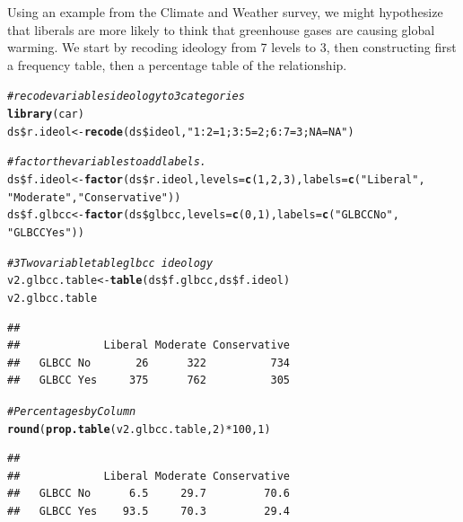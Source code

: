 \documentclass[11pt,openany]{book}\usepackage[]{graphicx}\usepackage[]{color}
\makeatletter
\newcommand{\hlnum}[1]{\textcolor[rgb]{0.686,0.059,0.569}{#1}}%
\newcommand{\hlstr}[1]{\textcolor[rgb]{0.192,0.494,0.8}{#1}}%
\newcommand{\hlcom}[1]{\textcolor[rgb]{0.678,0.584,0.686}{\textit{#1}}}%
\newcommand{\hlopt}[1]{\textcolor[rgb]{0,0,0}{#1}}%
\newcommand{\hlstd}[1]{\textcolor[rgb]{0.345,0.345,0.345}{#1}}%
\newcommand{\hlkwb}[1]{\textcolor[rgb]{0.69,0.353,0.396}{#1}}%
\newcommand{\hlkwc}[1]{\textcolor[rgb]{0.333,0.667,0.333}{#1}}%
\newcommand{\hlkwd}[1]{\textcolor[rgb]{0.737,0.353,0.396}{\textbf{#1}}}%
\newenvironment{kframe}{%
 \def\at@end@of@kframe{}%
 \ifinner\ifhmode%
  \def\at@end@of@kframe{\end{minipage}}%
  \begin{minipage}{\columnwidth}%
 \fi\fi%
 \def\FrameCommand##1{\hskip\@totalleftmargin \hskip-\fboxsep
 \colorbox{shadecolor}{##1}\hskip-\fboxsep
     \hskip-\linewidth \hskip-\@totalleftmargin \hskip\columnwidth}%
 \MakeFramed {\advance\hsize-\width
   \@totalleftmargin\z@ \linewidth\hsize
   \@setminipage}}%
 {\par\unskip\endMakeFramed%
 \at@end@of@kframe}
\newenvironment{knitrout}{}{} %
\renewenvironment{knitrout}{\begin{singlespace}}{\end{singlespace}}
\makeatother
\begin{document}
Using an example from the Climate and Weather survey, we might hypothesize that liberals are more likely to think that greenhouse gases are causing global warming.   We start by recoding ideology from 7 levels to 3, then constructing first a frequency table, then a percentage table of the relationship.
  
\begin{knitrout}
\color{fgcolor}\begin{kframe}
\begin{alltt}
\hlcom{# recode variables ideology to 3 categories}
\hlkwd{library}\hlstd{(car)}
\hlstd{ds}\hlopt{\$}\hlstd{r.ideol} \hlkwb{<-} \hlkwd{recode}\hlstd{(ds}\hlopt{\$}\hlstd{ideol,} \hlstr{"1:2=1; 3:5=2; 6:7=3; NA=NA"}\hlstd{)}

\hlcom{# factor the variables to add labels.}
\hlstd{ds}\hlopt{\$}\hlstd{f.ideol} \hlkwb{<-} \hlkwd{factor}\hlstd{(ds}\hlopt{\$}\hlstd{r.ideol,} \hlkwc{levels} \hlstd{=} \hlkwd{c}\hlstd{(}\hlnum{1}\hlstd{,} \hlnum{2}\hlstd{,} \hlnum{3}\hlstd{),} \hlkwc{labels} \hlstd{=} \hlkwd{c}\hlstd{(}\hlstr{"Liberal"}\hlstd{,}
    \hlstr{"Moderate"}\hlstd{,} \hlstr{"Conservative"}\hlstd{))}
\hlstd{ds}\hlopt{\$}\hlstd{f.glbcc} \hlkwb{<-} \hlkwd{factor}\hlstd{(ds}\hlopt{\$}\hlstd{glbcc,} \hlkwc{levels} \hlstd{=} \hlkwd{c}\hlstd{(}\hlnum{0}\hlstd{,} \hlnum{1}\hlstd{),} \hlkwc{labels} \hlstd{=} \hlkwd{c}\hlstd{(}\hlstr{"GLBCC No"}\hlstd{,}
    \hlstr{"GLBCC Yes"}\hlstd{))}

\hlcom{# 3 Two variable table glbcc~ideology}
\hlstd{v2.glbcc.table} \hlkwb{<-} \hlkwd{table}\hlstd{(ds}\hlopt{\$}\hlstd{f.glbcc, ds}\hlopt{\$}\hlstd{f.ideol)}
\hlstd{v2.glbcc.table}
\end{alltt}
\begin{verbatim}
##            
##             Liberal Moderate Conservative
##   GLBCC No       26      322          734
##   GLBCC Yes     375      762          305
\end{verbatim}
\end{kframe}
\end{knitrout}

\begin{knitrout}
\color{fgcolor}\begin{kframe}
\begin{alltt}
\hlcom{# Percentages by Column}
\hlkwd{round}\hlstd{(}\hlkwd{prop.table}\hlstd{(v2.glbcc.table,} \hlnum{2}\hlstd{)} \hlopt{*} \hlnum{100}\hlstd{,} \hlnum{1}\hlstd{)}
\end{alltt}
\begin{verbatim}
##            
##             Liberal Moderate Conservative
##   GLBCC No      6.5     29.7         70.6
##   GLBCC Yes    93.5     70.3         29.4
\end{verbatim}
\end{kframe}
\end{knitrout}
\end{document}
